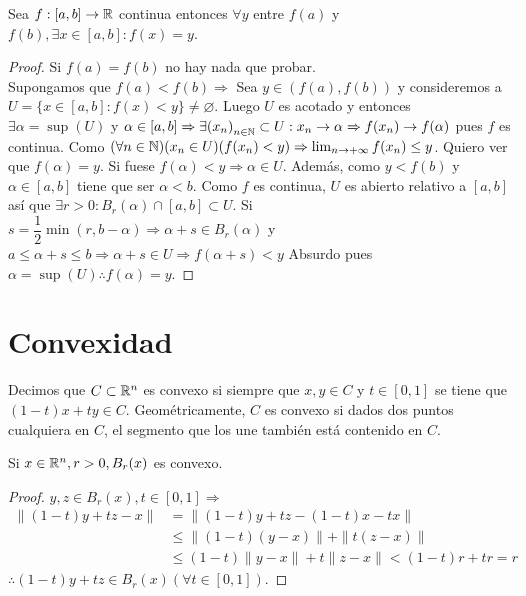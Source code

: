 \begin{theorem}
  Sea \(f: [a, b] \to \mathbb{R} \) continua entonces \(\forall y\) entre \(f(a)\) y \(f(b), \exists x \in [a, b] : f(x) = y\).

  \begin{proof}
    Si \(f(a) = f(b)\) no hay nada que probar. \\
    Supongamos que \(f(a) < f(b) \Rightarrow \) Sea \(y \in (f(a), f(b))\) y consideremos a \(U = \{ x \in [a, b] : f(x) < y \} \neq \varnothing \). Luego \(U\) es acotado y entonces \(\exists \alpha = \sup(U)\) y \(\alpha \in [a, b] \Rightarrow \exists {(x_n)}_{n \in \mathbb{N}} \subset U : x_n \to \alpha \Rightarrow f(x_n) \to f(\alpha)\) pues \(f\) es continua. Como \((\forall n \in \mathbb{N})(x_n \in U)(f(x_n) < y) \Rightarrow \lim_{n \to +\infty} f(x_n) \leq y\). Quiero ver que \(f(\alpha) = y\). Si fuese \(f(\alpha) < y \Rightarrow \alpha \in U\). Además, como \(y < f(b)\) y \(\alpha \in [a, b]\) tiene que ser \(\alpha < b\). Como \(f\) es continua, \(U\) es abierto relativo a \([a, b]\) así que \(\exists r > 0 : B_r(\alpha) \cap [a, b] \subset U\). Si \(s = \dfrac{1}{2} \min(r, b-\alpha) \Rightarrow \alpha + s \in B_r(\alpha)\) y \(a \leq \alpha + s \leq b \Rightarrow \alpha + s \in U \Rightarrow f(\alpha + s) < y\) Absurdo pues \(\alpha = \sup(U) \therefore f(\alpha) = y\).
  \end{proof}
\end{theorem}

\section{Convexidad}

\begin{definition}[Convexidad]
  Decimos que \(C \subset \mathbb{R}^n\) es convexo si siempre que \(x, y \in C\) y \(t \in [0, 1]\) se tiene que \((1-t)x+ty \in C\). Geométricamente, \(C\) es convexo si dados dos puntos cualquiera en \(C\), el segmento que los une también está contenido en \(C\).
\end{definition}

\begin{eg}
  Si \(x \in \mathbb{R}^n, r > 0, B_r(x)\) es convexo.
  \begin{proof}
    \(y, z \in B_r(x), t \in [0,1] \Rightarrow \) \begin{align*}
      \|(1-t)y+tz - x\| & = \| (1-t)y + tz - (1-t)x - tx \|                \\
                        & \leq \|(1 -t) (y-x) \| + \|t(z-x)\|              \\
                        & \leq (1-t) \|y-x\| + t \|z-x\| < (1-t)r + tr = r
    \end{align*} \(\therefore (1-t)y + tz \in B_r(x) (\forall t \in [0, 1])\).
  \end{proof}
\end{eg}

